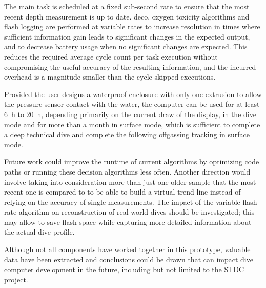 The main task is scheduled at a fixed sub-second rate to ensure that the most recent depth measurement is up to date. \gls{deco}, oxygen toxicity algorithms and flash logging are performed at variable rates to increase resolution in times where sufficient information gain leads to significant changes in the expected output, and to decrease battery usage when no significant changes are expected.
This reduces the required average cycle count per task execution without compromising the useful accuracy of the resulting information, and the incurred overhead is a magnitude smaller than the cycle skipped executions.

Provided the user designs a waterproof enclosure with only one extrusion to allow the pressure sensor contact with the water, the computer can be used for at least \SI{6}{\hour} to \SI{20}{\hour}, depending primarily on the current draw of the display, in the dive mode and for more than a month in surface mode, which is sufficient to complete a deep technical dive and complete the following offgassing tracking in surface mode.

Future work could improve the runtime of current algorithms by optimizing code paths or running these decision algorithms less often. 
Another direction would involve taking into consideration more than just one older sample that the most recent one is compared to to be able to build a virtual trend line instead of relying on the accuracy of single measurements.
The impact of the variable flash rate algorithm on reconstruction of real-world dives should be investigated; this may allow to save flash space while capturing more detailed information about the actual dive profile.

Although not all components have worked together in this prototype, valuable data have been extracted and conclusions could be drawn that can impact dive computer development in the future, including but not limited to the STDC project.
